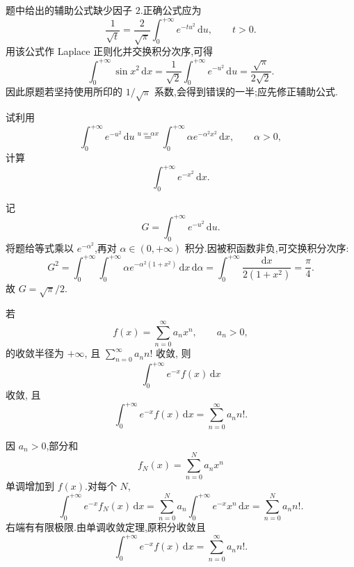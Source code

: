 \begin{solution}
    题中给出的辅助公式缺少因子 $2$.正确公式应为
    \[
        \dfrac{1}{\sqrt t}=\dfrac{2}{\sqrt\pi}\int_0^{+\infty}e^{-tu^2}\,\mathrm{d}u,
        \qquad t>0.
    \]
    用该公式作 Laplace 正则化并交换积分次序,可得
    \[
        \displaystyle\int_0^{+\infty}\sin x^2\,\mathrm{d}x
        =\dfrac{1}{\sqrt2}\int_0^{+\infty}e^{-u^2}\,\mathrm{d}u
        =\dfrac{\sqrt\pi}{2\sqrt2}.
    \]
    因此原题若坚持使用所印的 $1/\sqrt\pi$ 系数,会得到错误的一半;应先修正辅助公式.
\end{solution}

\begin{example}
    试利用
    \[
        \displaystyle\int_0^{+\infty}e^{-u^2}\,\mathrm{d}u
        \overset{u=\alpha x}{=}
        \int_0^{+\infty}\alpha e^{-\alpha^2x^2}\,\mathrm{d}x,
        \qquad \alpha>0,
    \]
    计算
    \[
        \displaystyle\int_0^{+\infty}e^{-x^2}\,\mathrm{d}x.
    \]
\end{example}
\exampleblank

\begin{solution}
    记
    \[
        G=\int_0^{+\infty}e^{-u^2}\,\mathrm{d}u.
    \]
    将题给等式乘以 $e^{-\alpha^2}$,再对 $\alpha\in(0,+\infty)$ 积分.因被积函数非负,可交换积分次序:
    \[
        G^2=\int_0^{+\infty}\int_0^{+\infty}
        \alpha e^{-\alpha^2(1+x^2)}\,\mathrm{d}x\,\mathrm{d}\alpha
        =\int_0^{+\infty}\dfrac{\mathrm{d}x}{2(1+x^2)}
        =\dfrac{\pi}{4}.
    \]
    故 $G=\sqrt\pi/2$.
\end{solution}

\begin{example}
    若
    \[
        f(x)=\sum\limits_{n=0}^{\infty}a_nx^n,\qquad a_n>0,
    \]
    的收敛半径为 $+\infty$, 且 $\displaystyle\sum\limits_{n=0}^{\infty}a_nn!$ 收敛, 则
    \[
        \displaystyle\int_0^{+\infty}e^{-x}f(x)\,\mathrm{d}x
    \]
    收敛, 且
    \[
        \displaystyle\int_0^{+\infty}e^{-x}f(x)\,\mathrm{d}x
        =\sum\limits_{n=0}^{\infty}a_nn!.
    \]
\end{example}
\exampleblank

\begin{solution}
    因 $a_n>0$,部分和
    \[
        f_N(x)=\sum\limits_{n=0}^N a_nx^n
    \]
    单调增加到 $f(x)$.对每个 $N$,
    \[
        \displaystyle\int_0^{+\infty}e^{-x}f_N(x)\,\mathrm{d}x
        =\sum\limits_{n=0}^Na_n\int_0^{+\infty}e^{-x}x^n\,\mathrm{d}x
        =\sum\limits_{n=0}^Na_nn!.
    \]
    右端有有限极限.由单调收敛定理,原积分收敛且
    \[
        \displaystyle\int_0^{+\infty}e^{-x}f(x)\,\mathrm{d}x
        =\sum\limits_{n=0}^{\infty}a_nn!.
    \]
\end{solution}

